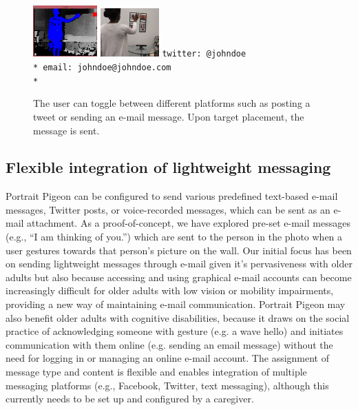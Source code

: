 \documentclass{chi-ext}
\begin{document}
\begin{figure}
    \centering
    \includegraphics[width=0.22\textwidth]{depthtracking.png} \includegraphics[width=0.2\textwidth]{backwallshot.png}
	\texttt{twitter: @johndoe \\*
	email: johndoe@johndoe.com \\*}    
    \caption{The user can toggle between different platforms such as posting a tweet or sending an e-mail message. Upon target placement, the message is sent.}
	 \label{fig:tracking}
\end{figure}

\subsection{Flexible integration of lightweight messaging}
Portrait Pigeon can be configured to send various predefined text-based e-mail messages, Twitter posts, or voice-recorded messages, which can be sent as an e-mail attachment. As a proof-of-concept, we have explored pre-set e-mail messages (e.g., ``I am thinking of you.'') which are sent to the person in the photo when a user gestures towards that person's picture on the wall. Our initial focus has been on sending lightweight messages through e-mail given it's pervasiveness with older adults \cite{Pew2012} but also because accessing and using graphical e-mail accounts can become increasingly difficult for older adults with low vision or mobility impairments, providing a new way of maintaining e-mail communication. Portrait Pigeon may also benefit older adults with cognitive disabilities, because it draws on the social practice of acknowledging someone with gesture (e.g. a wave hello) and initiates communication with them online (e.g. sending an email message) without the need for logging in or managing an online e-mail account. The assignment of message type and content is flexible and enables integration of multiple messaging platforms (e.g., Facebook, Twitter, text messaging), although this currently needs to be set up and configured by a caregiver.
\end{document}
